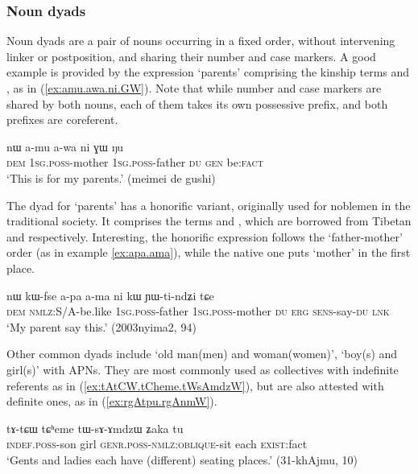 \subsubsection{Noun dyads} \label{sec:dyads}
Noun dyads are a pair of nouns occurring in a fixed order, without intervening linker or postposition, and sharing their number and case markers. A good example is provided by the expression `parents' comprising the kinship terms  and , as in (\ref{ex:amu.awa.ni.GW}). Note that while number and case markers are shared by both nouns, each of them takes its own possessive prefix, and both prefixes are coreferent. 

\begin{exe}
\ex \label{ex:amu.awa.ni.GW}
 \gll nɯ a-mu a-wa ni ɣɯ ŋu \\
 \textsc{dem}  \textsc{1sg}.\textsc{poss}-mother \textsc{1sg}.\textsc{poss}-father \textsc{du} \textsc{gen} be:\textsc{fact} \\
 \glt `This is for my parents.' (meimei de gushi)
\end{exe}

The dyad for `parents' has a honorific variant, originally used for noblemen in the traditional society. It comprises the terms  and , which are borrowed from Tibetan   and  respectively. Interesting, the honorific expression follows the `father-mother' order (as in example \ref{ex:apa.ama}), while the native one puts `mother' in the first place.

\begin{exe}
\ex \label{ex:apa.ama}
 \gll nɯ kɯ-fse a-pa a-ma ni kɯ ɲɯ-ti-ndʑi tɕe \\
 \textsc{dem} \textsc{nmlz}:S/A-be.like \textsc{1sg}.\textsc{poss}-father  \textsc{1sg}.\textsc{poss}-mother \textsc{du} \textsc{erg} \textsc{sens}-say-\textsc{du} \textsc{lnk} \\
 \glt `My parent say this.' (2003nyima2, 94)
\end{exe}

Other common dyads include  `old man(men) and woman(women)',  `boy(s) and girl(s)' with APNs. They are most commonly used as collectives with indefinite referents as in (\ref{ex:tAtCW.tCheme.tWsAmdzW}), but are also attested with definite ones, as in (\ref{ex:rgAtpu.rgAnmW}).

\begin{exe}
\ex \label{ex:tAtCW.tCheme.tWsAmdzW}
 \gll  tɤ-tɕɯ tɕʰeme tɯ-sɤ-ɤmdzɯ ʑaka tu \\
 \textsc{indef}.\textsc{poss}-son girl \textsc{genr}.\textsc{poss}-\textsc{nmlz}:\textsc{oblique}-sit each \textsc{exist}:fact \\
\glt `Gents and ladies each have (different) seating places.' (31-khAjmu, 10)
\end{exe}

